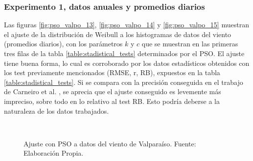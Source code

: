 \subsubsection{Experimento 1, datos anuales y promedios diarios}
Las figuras \ref{fig:pso_valpo_13}, \ref{fig:pso_valpo_14} y \ref{fig:pso_valpo_15} muestran el ajuste de la distribución de Weibull a los histogramas de datos del viento (promedios diarios), con los parámetros $k$ y $c$  que se muestran en las primeras tres filas de la tabla \ref{table:stadistical_tests} determinados por el PSO. El ajuste tiene buena forma, lo cual es corroborado por los datos estadísticos obtenidos con los test previamente mencionados (RMSE, r, RB), expuestos en la tabla \ref{table:stadistical_tests}. Si se compara con la precisión conseguida en el trabajo de Carneiro et al. \cite{Carneiro15}, se aprecia que el ajuste conseguido es levemente más impreciso, sobre todo en lo relativo al test RB. Esto podría deberse a la naturaleza de los datos 
trabajados.\\
\begin{figure}[ht!]
    \centering
        \\
    \caption{Ajuste con PSO a datos del viento de Valparaíso. Fuente: Elaboración Propia.}
    \label{fig:subfigures}
\end{figure}

